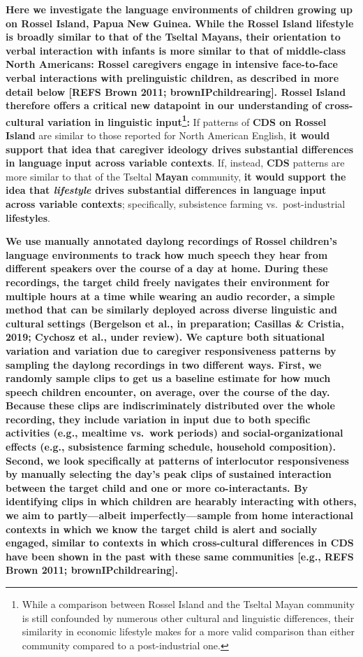 \documentclass[,man,floatsintext]{apa6}
\let\rmarkdownfootnote\footnote%
\def\footnote{\protect\rmarkdownfootnote}
\begin{document}
\textbf{Here we investigate the language environments of children
growing up on Rossel Island, Papua New Guinea. While the Rossel Island
lifestyle is broadly similar to that of the Tseltal Mayans, their
orientation to verbal interaction with infants is more similar to that
of middle-class North Americans: Rossel caregivers engage in intensive
face-to-face verbal interactions with prelinguistic children, as
described in more detail below {[}REFS Brown 2011;
brownIPchildrearing{]}. Rossel Island therefore offers a critical new
datapoint in our understanding of cross-cultural variation in linguistic
input\footnote{While a comparison between Rossel Island and the Tseltal
  Mayan community is still confounded by numerous other cultural and
  linguistic differences, their similarity in economic lifestyle makes
  for a more valid comparison than either community compared to a
  post-industrial one.}:} If patterns of \textbf{CDS on Rossel Island}
are similar to those reported for North American English, \textbf{it
would support that idea that caregiver ideology drives substantial
differences in language input across variable contexts}. If, instead,
\textbf{CDS} patterns are more similar to that of the Tseltal
\textbf{Mayan} community, \textbf{it would support the idea that
\emph{lifestyle} drives substantial differences in language input across
variable contexts}; specifically, subsistence farming
vs.~post-industrial \textbf{lifestyles}.

\textbf{We use manually annotated daylong recordings of Rossel
children's language environments to track how much speech they hear from
different speakers over the course of a day at home. During these
recordings, the target child freely navigates their environment for
multiple hours at a time while wearing an audio recorder, a simple
method that can be similarly deployed across diverse linguistic and
cultural settings (Bergelson et al., in preparation; Casillas \&
Cristia, 2019; Cychosz et al., under review). We capture both
situational variation and variation due to caregiver responsiveness
patterns by sampling the daylong recordings in two different ways.
First, we randomly sample clips to get us a baseline estimate for how
much speech children encounter, on average, over the course of the day.
Because these clips are indiscriminately distributed over the whole
recording, they include variation in input due to both specific
activities (e.g., mealtime vs.~work periods) and social-organizational
effects (e.g., subsistence farming schedule, household composition).
Second, we look specifically at patterns of interlocutor responsiveness
by manually selecting the day's peak clips of sustained interaction
between the target child and one or more co-interactants. By identifying
clips in which children are hearably interacting with others, we aim to
partly---albeit imperfectly---sample from home interactional contexts in
which we know the target child is alert and socially engaged, similar to
contexts in which cross-cultural differences in CDS have been shown in
the past with these same communities {[}e.g., REFS Brown 2011;
brownIPchildrearing{]}.}
\end{document}
